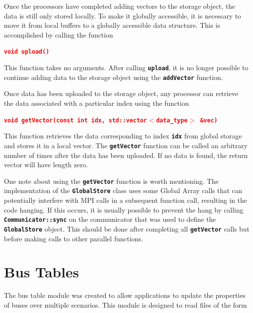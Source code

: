 \documentclass[12pt]{report} %
\begin{document}


Once the processors have completed adding vectors to the storage object, the data is still only stored locally. To make it globally accessible, it is necessary to move it from local buffers to a globally accessible data structure. This is accomplished by calling the function

\textcolor{red}{\texttt{\textbf{void upload()}}}

This function takes no arguments. After calling \texttt{\textbf{upload}}, it is no longer possible to continue adding data to the storage object using the \texttt{\textbf{addVector}} function.

Once data has been uploaded to the storage object, any processor can retrieve the data associated with a particular index using the function

\textcolor{red}{\texttt{\textbf{void getVector(const int idx, std::vector$\boldsymbol{\mathrm{<}}$data\_type$\boldsymbol{\mathrm{>}}$ \&vec)}}}

This function retrieves the data corresponding to index \texttt{\textbf{idx}} from global storage and stores it in a local vector. The \texttt{\textbf{getVector}} function can be called an arbitrary number of times after the data has been uploaded. If no data is found, the return vector will have length zero.

One note about using the \texttt{\textbf{getVector}} function is worth mentioning. The implementation of the \texttt{\textbf{GlobalStore}} class uses some Global Array calls that can potentially interfere with MPI calls in a subsequent function call, resulting in the code hanging. If this occurs, it is usually possible to prevent the hang by calling \texttt{\textbf{Communicator::sync}} on the communicator that was used to define the \texttt{\textbf{GlobalStore}} object. This should be done after completing all \texttt{\textbf{getVector}} calls but before making calls to other parallel functions.

\section{Bus Tables}

The bus table module was created to allow applications to update the properties of buses over multiple scenarios. This module is designed to read files of the form
\end{document}
